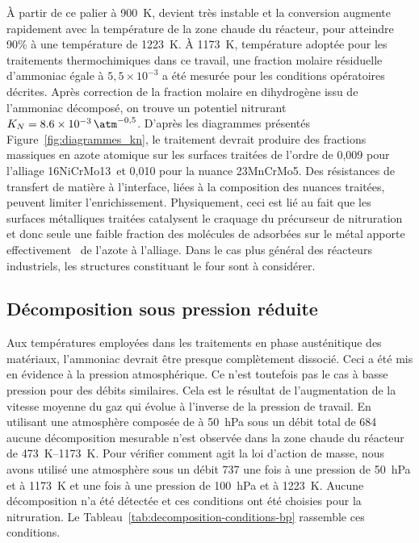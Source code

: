 À partir de ce palier à \SI{900}{\kelvin},  devient très instable et la conversion augmente rapidement avec la température de la zone chaude du réacteur, pour atteindre 90\% à une température de \SI{1223}{\kelvin}. À \SI{1173}{\kelvin}, température adoptée pour les traitements thermochimiques dans ce travail, une fraction molaire résiduelle d'ammoniac égale à $5,5\times10^{-3}$ a été mesurée pour les conditions opératoires décrites. Après correction de la fraction molaire en dihydrogène issu de l'ammoniac décomposé, on trouve un potentiel nitrurant $K_{N}=\SI{8,6e-03}{\atm^{-0,5}}$.  D'après les diagrammes présentés Figure~\ref{fig:diagrammes_kn}, le traitement devrait produire des fractions massiques en azote atomique sur les surfaces traitées de l'ordre de 0,009 pour l'alliage 16NiCrMo13 et 0,010 pour la nuance 23MnCrMo5. Des résistances de transfert de matière à l'interface, liées à la composition des nuances traitées, peuvent limiter l'enrichissement.  Physiquement, ceci est lié au fait que les surfaces métalliques traitées catalysent le craquage du précurseur de nitruration et donc seule une faible fraction des molécules de  adsorbées sur le métal apporte effectivement~\cite{Wrobel2006,Arabczyk2009} de l'azote à l'alliage. Dans le cas plus général des réacteurs industriels, les structures constituant le four sont à considérer.

\subsection{Décomposition sous pression réduite}
\label{sec:decomposition_nh3_bp}

Aux températures employées dans les traitements en phase austénitique des matériaux, l'ammoniac devrait être presque complètement dissocié. Ceci a été mis en évidence à la pression atmosphérique. Ce n'est toutefois pas le cas à basse pression pour des débits similaires. Cela est le résultat de l'augmentation de la vitesse moyenne du gaz qui évolue à l'inverse de la pression de travail. En utilisant une atmosphère composée de  à \SI{50}{\hecto\pascal} sous un débit total de \SI{684}{\sccm} aucune décomposition mesurable n'est observée dans la zone chaude du réacteur \textemdash{} de \SIrange{473}{1173}{\kelvin}.  Pour vérifier comment agit la loi d'action de masse, nous avons utilisé une atmosphère  sous un débit \SI{737}{\sccm} une fois à une pression de \SI{50}{\hecto\pascal} et à \SI{1173}{\kelvin} et une fois à une pression de \SI{100}{\hecto\pascal} et à \SI{1223}{\kelvin}. Aucune décomposition n'a été détectée et ces conditions ont été choisies pour la nitruration. Le Tableau~\ref{tab:decomposition-conditions-bp} rassemble ces conditions. 

